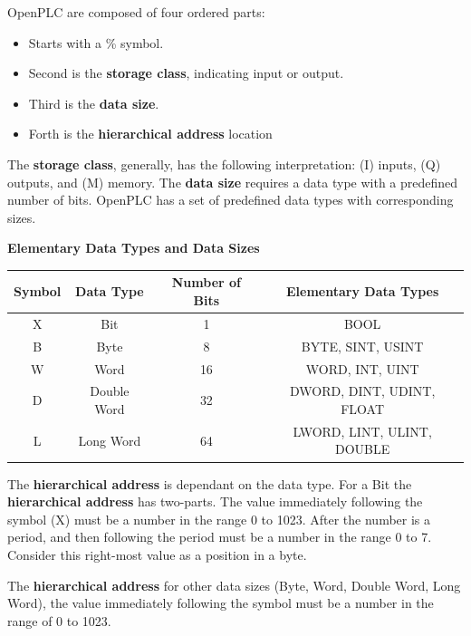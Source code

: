 OpenPLC are composed of four ordered parts:
\begin{itemize}[noitemsep]
    \item Starts with a \% symbol.
    \item Second is the \textbf{storage class}, indicating input or output.
    \item Third is the \textbf{data size}.
    \item Forth is the \textbf{hierarchical address} location
\end{itemize}
   
The \textbf{storage class}, generally, has the following interpretation: (I) inputs, (Q) outputs, and (M) memory. The \textbf{data size} requires a data type with a predefined number of bits. OpenPLC has a set of predefined data types with corresponding sizes. 

\begin{adjustwidth}{1.5cm}{0cm}
    \begin{center}
        \textbf{Elementary Data Types and Data Sizes} \\
    \end{center}
    \begin{tabular}{|c|c|c|c|} 
    \hline 
    \textbf{Symbol} & \textbf{Data Type} & \textbf{Number of Bits} & \textbf{Elementary Data Types} \\
    \hline 
    X & Bit & 1 & BOOL\\
    \hline
    B &	Byte &	8 &	BYTE, SINT, USINT\\
    \hline
    W &	Word &	16 & WORD, INT, UINT\\
    \hline
    D &	Double Word &	32 &	DWORD, DINT, UDINT, FLOAT\\
    \hline
    L &	Long Word &	64 & LWORD, LINT, ULINT, DOUBLE\\
    \hline
    \end{tabular}
    \label{table:dataTypes}
\end{adjustwidth}



The \textbf{hierarchical address} is dependant on the data type. For a Bit the \textbf{hierarchical address}
has two-parts. The value immediately following the symbol (X) must be a number in the range  0 to 1023. After the number is a period, and then following the period must be a number in the range 0 to 7. Consider this right-most value as a position in a byte.

The \textbf{hierarchical address} for other data sizes (Byte, Word, Double Word, Long Word), the value immediately following the symbol must be a number in the range of 0 to 1023. 


